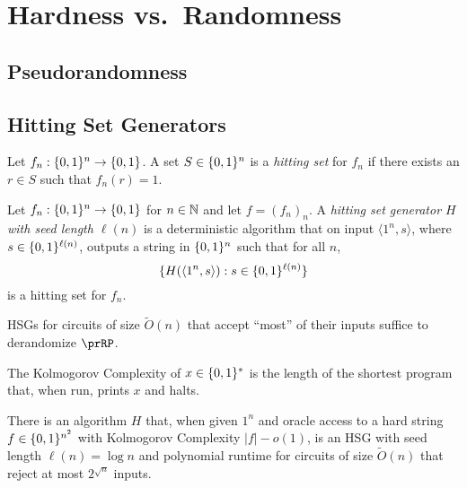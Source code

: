 \chapter{Hardness vs.\ Randomness}
\label{lec:02}

\section{Pseudorandomness}

\section{Hitting Set Generators}

\begin{definition}
  Let $f_n : \{0, 1\}^n \to \{0, 1\}$.
  A set $S \in \{0, 1\}^{n}$ is a \emph{hitting set} for $f_n$ if there exists an $r \in S$ such that $f_n(r) = 1$.
\end{definition}

\begin{definition}
  Let $f_n : \{0, 1\}^n \to \{0, 1\}$ for $n \in \mathbb{N}$ and let $f = (f_n)_n$.
  A \emph{hitting set generator $H$ with seed length $\ell(n)$} is a deterministic algorithm that on input $\langle 1^n, s \rangle$, where $s \in \{0, 1\}^{\ell(n)}$, outputs a string in $\{0, 1\}^n$ such that for all $n$, \[
    \{ H(\langle 1^n, s \rangle) : s \in \{0, 1\}^{\ell(n)} \}
  \] is a hitting set for $f_n$.
\end{definition}

\begin{theorem}
    HSGs for circuits of size $\widetilde{O}(n)$ that accept ``most'' of their inputs 
    suffice to derandomize $\prRP$.
\end{theorem}


\begin{definition}
    The Kolmogorov Complexity of $x \in \{0, 1\}^*$ is the length of the shortest 
    program that, when run, prints $x$ and halts.
\end{definition}

\begin{theorem}
    There is an algorithm $H$ that, when given $1^n$ and oracle access to a hard 
    string $f \in \{0, 1\}^{n^2}$ with Kolmogorov Complexity $|f| - o(1)$, is 
    an HSG with seed length $\ell(n) = \log{n}$ and polynomial runtime for circuits 
    of size $\widetilde{O}(n)$ that reject at most $2^{\sqrt{n}}$ inputs.
\end{theorem}

